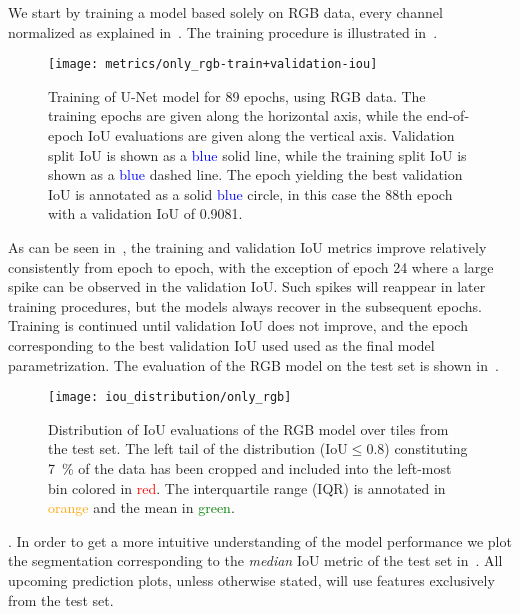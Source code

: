 We start by training a model based solely on RGB data, every channel normalized as explained in~.
The training procedure is illustrated in~.

\begin{figure}[H]
  \centering
  \texttt{[image: metrics/only\_rgb-train+validation-iou]}
  \caption{%
    Training of U-Net model for 89 epochs, using RGB data.
    The training epochs are given along the horizontal axis, while the end-of-epoch IoU evaluations are given along the vertical axis.
    Validation split IoU is shown as a \textcolor{blue}{blue} solid line, while the training split IoU is shown as a \textcolor{blue}{blue} dashed line.
    The epoch yielding the best validation IoU is annotated as a solid \textcolor{blue}{blue} circle, in this case the 88th epoch with a validation IoU of \num{0.9081}.
  }%
  \label{fig:rgb-training}
\end{figure}

As can be seen in~, the training and validation IoU metrics improve relatively consistently from epoch to epoch, with the exception of epoch 24 where a large spike can be observed in the validation IoU.
Such spikes will reappear in later training procedures, but the models always recover in the subsequent epochs.
Training is continued until validation IoU does not improve, and the epoch corresponding to the best validation IoU used used as the final model parametrization.
The evaluation of the RGB model on the test set is shown in~.

\begin{figure}[H]
  \centering
  \texttt{[image: iou\_distribution/only\_rgb]}
  \caption{%
    Distribution of IoU evaluations of the RGB model over tiles from the test set.
    The left tail of the distribution ($\mathrm{IoU} \leq 0.8$) constituting \SI{7}{\percent} of the data has been cropped and included into the left-most bin colored in \textcolor{red}{red}.
    The interquartile range (IQR) is annotated in \textcolor{orange}{orange} and the mean in \textcolor{green}{green}.
  }%
  \label{fig:rgb-model-test}\label{fig:iou-distribution-explanation}
\end{figure}

.
In order to get a more intuitive understanding of the model performance we plot the segmentation corresponding to the \textit{median} IoU metric of the test set in~.
All upcoming prediction plots, unless otherwise stated, will use features exclusively from the test set.

